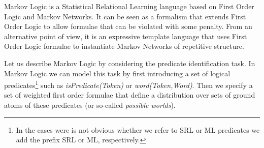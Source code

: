 Markov Logic \citep[ML, ][]{richardson05markov} is a Statistical Relational Learning language based on First Order Logic and Markov Networks. It can be seen as a formalism that extends First Order Logic to allow formulae that can be violated
with some penalty. From an alternative point of view, it is an expressive
template language that uses First Order Logic formulae to instantiate
Markov Networks of repetitive structure. 

Let us describe Markov Logic by considering the predicate identification task. In Markov Logic we can model this task by first introducing a set of logical predicates\footnote{In the cases were is not obvious whether we refer to SRL or ML predicates we add the prefix SRL or ML, respectively.} such as \emph{isPredicate(Token)} or \emph{word(Token,Word)}. Then we specify a set of weighted first order formulae that define a distribution over sets of ground atoms of these predicates (or so-called \emph{possible worlds}). 

